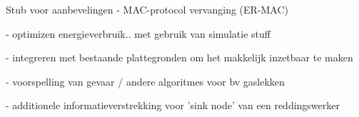 
Stub voor aanbevelingen
- MAC-protocol vervanging (ER-MAC)

- optimizen energieverbruik.. met gebruik van simulatie stuff

- integreren met bestaande plattegronden om het makkelijk inzetbaar te maken

- voorspelling van gevaar / andere algoritmes voor bv gaslekken

- additionele informatieverstrekking voor 'sink node' van een reddingswerker

